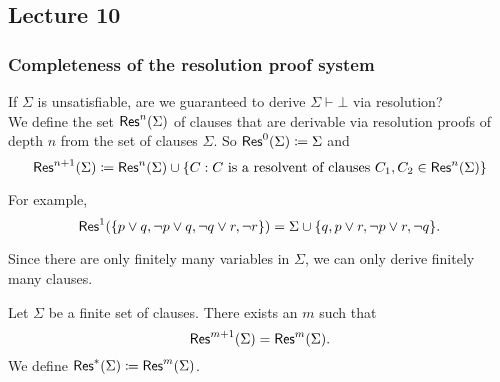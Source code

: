 \subsection{Lecture 10}

\subsubsection{Completeness of the resolution proof system}

If $\Sigma$ is unsatisfiable, are we guaranteed to derive $\Sigma\vdash\bot$ via resolution?\\

We define the set $\mathsf{Res}^n(\Sigma)$ of clauses that are derivable via resolution proofs of depth $n$ from the set of clauses $\Sigma$. So $\mathsf{Res}^0(\Sigma)\coloneqq\Sigma$ and
\[ \mathsf{Res}^{n+1}(\Sigma)\coloneqq\mathsf{Res}^n(\Sigma)\cup\{C : C\text{ is a resolvent of clauses }C_1,C_2\in\mathsf{Res}^n(\Sigma)\} \]

For example,
\[ \mathsf{Res}^1(\{p\vee q, \neg p\vee q, \neg q\vee r, \neg r\}) = \Sigma\cup\{q, p\vee r, \neg p\vee r,\neg q\}. \]

Since there are only finitely many variables in $\Sigma$, we can only derive finitely many clauses.

\begin{definition}
	Let $\Sigma$ be a finite set of clauses. There exists an $m$ such that
	\[ \mathsf{Res}^{m+1}(\Sigma) = \mathsf{Res}^m(\Sigma). \]
	We define $\mathsf{Res}^*(\Sigma)\coloneqq\mathsf{Res}^m(\Sigma)$.
\end{definition}

